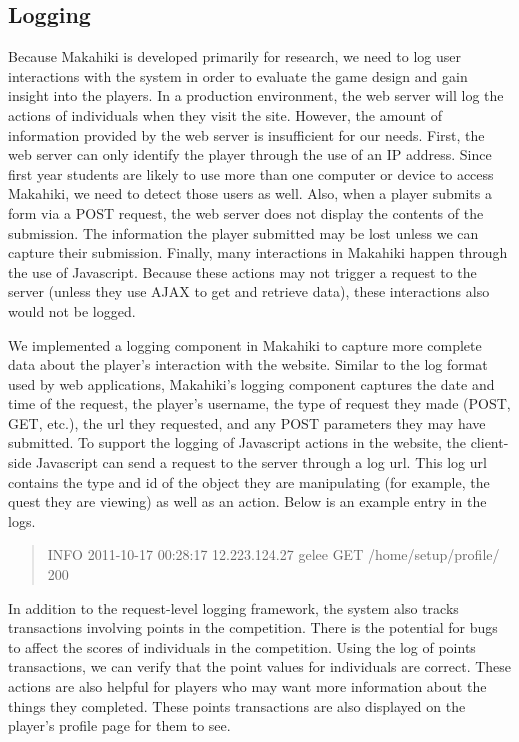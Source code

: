 \subsection{Logging}
\label{makahiki:components-logging}

Because Makahiki is developed primarily for research, we need to log user interactions with the system in order to evaluate the game design and gain insight into the players. In a production environment, the web server will log the actions of individuals when they visit the site. However, the amount of information provided by the web server is insufficient for our needs. First, the web server can only identify the player through the use of an IP address. Since first year students are likely to use more than one computer or device to access Makahiki, we need to detect those users as well. Also, when a player submits a form via a POST request, the web server does not display the contents of the submission. The information the player submitted may be lost unless we can capture their submission. Finally, many interactions in Makahiki happen through the use of Javascript. Because these actions may not trigger a request to the server (unless they use AJAX to get and retrieve data), these interactions also would not be logged.

We implemented a logging component in Makahiki to capture more complete data about the player's interaction with the website. Similar to the log format used by web applications, Makahiki's logging component captures the date and time of the request, the player's username, the type of request they made (POST, GET, etc.), the url they requested, and any POST parameters they may have submitted. To support the logging of Javascript actions in the website, the client-side Javascript can send a request to the server through a log url. This log url contains the type and id of the object they are manipulating (for example, the quest they are viewing) as well as an action. Below is an example entry in the logs.

\begin{quote}INFO 2011-10-17 00:28:17 12.223.124.27 gelee GET /home/setup/profile/ 200 \end{quote}

In addition to the request-level logging framework, the system also tracks transactions involving points in the competition. There is the potential for bugs to affect the scores of individuals in the competition. Using the log of points transactions, we can verify that the point values for individuals are correct. These actions are also helpful for players who may want more information about the things they completed. These points transactions are also displayed on the player's profile page for them to see.

